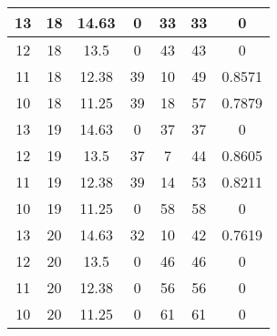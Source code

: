 \documentclass[letterpaper, 12pt]{article}
\begin{document}
\begin{longtable}{|c|c|c|c|c|c|c|}
\hline
13 & 18 & 14.63 & 0 & 33 & 33 & 0 \\
\hline
12 & 18 & 13.5 & 0 & 43 & 43 & 0 \\
\hline
11 & 18 & 12.38 & 39 & 10 & 49 & 0.8571 \\
\hline
10 & 18 & 11.25 & 39 & 18 & 57 & 0.7879 \\
\hline
13 & 19 & 14.63 & 0 & 37 & 37 & 0 \\
\hline
12 & 19 & 13.5 & 37 & 7 & 44 & 0.8605 \\
\hline
11 & 19 & 12.38 & 39 & 14 & 53 & 0.8211 \\
\hline
10 & 19 & 11.25 & 0 & 58 & 58 & 0 \\
\hline
13 & 20 & 14.63 & 32 & 10 & 42 & 0.7619 \\
\hline
12 & 20 & 13.5 & 0 & 46 & 46 & 0 \\
\hline
11 & 20 & 12.38 & 0 & 56 & 56 & 0 \\
\hline
10 & 20 & 11.25 & 0 & 61 & 61 & 0 \\
\hline
\end{longtable}
\end{document}
